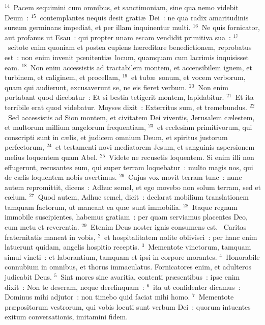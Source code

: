 ${}^{14}$~Pacem sequimini cum omnibus, et sanctimoniam, sine qua nemo videbit Deum~:
${}^{15}$~contemplantes nequis desit grati\ae\ Dei~: ne qua radix amaritudinis sursum germinans impediat, et per illam inquinentur multi.
${}^{16}$~Ne quis fornicator, aut profanus ut Esau~: qui propter unam escam vendidit primitiva sua~:
${}^{17}$~scitote enim quoniam et postea cupiens h\ae reditare benedictionem, reprobatus est~: non enim invenit pœnitenti\ae\ locum, quamquam cum lacrimis inquisisset eam.
${}^{18}$~Non enim accessistis ad tractabilem montem, et accensibilem ignem, et turbinem, et caliginem, et procellam,
${}^{19}$~et tub\ae\ sonum, et vocem verborum, quam qui audierunt, excusaverunt se, ne eis fieret verbum.
${}^{20}$~Non enim portabant quod dicebatur~: Et si bestia tetigerit montem, lapidabitur.
${}^{21}$~Et ita terribile erat quod videbatur. Moyses dixit~: Exterritus sum, et tremebundus.
${}^{22}$~Sed accessistis ad Sion montem, et civitatem Dei viventis, Jerusalem c\ae lestem, et multorum millium angelorum frequentiam,
${}^{23}$~et ecclesiam primitivorum, qui conscripti sunt in c\ae lis, et judicem omnium Deum, et spiritus justorum perfectorum,
${}^{24}$~et testamenti novi mediatorem Jesum, et sanguinis aspersionem melius loquentem quam Abel.
${}^{25}$~Videte ne recusetis loquentem. Si enim illi non effugerunt, recusantes eum, qui super terram loquebatur~: multo magis nos, qui de c\ae lis loquentem nobis avertimus.
${}^{26}$~Cujus vox movit terram tunc~: nunc autem repromittit, dicens~: Adhuc semel, et ego movebo non solum terram, sed et c\ae lum.
${}^{27}$~Quod autem, Adhuc semel, dicit~: declarat mobilium translationem tamquam factorum, ut maneant ea qu\ae\ sunt immobilia.
${}^{28}$~Itaque regnum immobile suscipientes, habemus gratiam~: per quam serviamus placentes Deo, cum metu et reverentia.
${}^{29}$~Etenim Deus noster ignis consumens est.
~Caritas fraternitatis maneat in vobis,
${}^{2}$~et hospitalitatem nolite oblivisci~: per hanc enim latuerunt quidam, angelis hospitio receptis.
${}^{3}$~Mementote vinctorum, tamquam simul vincti~: et laborantium, tamquam et ipsi in corpore morantes.
${}^{4}$~Honorabile connubium in omnibus, et thorus immaculatus. Fornicatores enim, et adulteros judicabit Deus.
${}^{5}$~Sint mores sine avaritia, contenti pr\ae sentibus~: ipse enim dixit~: Non te deseram, neque derelinquam~:
${}^{6}$~ita ut confidenter dicamus~: Dominus mihi adjutor~: non timebo quid faciat mihi homo.
${}^{7}$~Mementote pr\ae positorum vestrorum, qui vobis locuti sunt verbum Dei~: quorum intuentes exitum conversationis, imitamini fidem.
